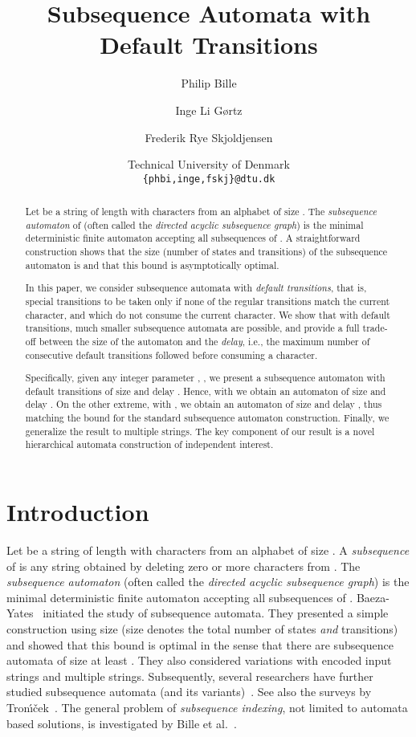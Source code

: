 \documentclass[a4paper,11pt]{article}
\title{Subsequence Automata with Default Transitions}
\author{Philip Bille \and Inge Li G\o rtz \and Frederik Rye Skjoldjensen}
\date{\small Technical University of Denmark\\ 
  \footnotesize\texttt{\{phbi,inge,fskj\}@dtu.dk}}
\begin{document}
\maketitle
\begin{abstract}
Let  be a string of length  with characters from an alphabet of size . The  \emph{subsequence automaton} of  (often called the \emph{directed acyclic subsequence graph}) is the minimal deterministic finite automaton accepting all subsequences of . A straightforward construction shows that the size (number of states and transitions) of the subsequence automaton is   and that this bound is asymptotically optimal. 

In this paper, we consider subsequence automata with \emph{default transitions}, that is, special transitions to be taken only if none of the regular transitions match the current character, and which do not consume the current character. We show that with default transitions, much smaller subsequence automata are possible, and provide a full trade-off between the size of the automaton and the \emph{delay}, i.e., the maximum number of consecutive default transitions followed before consuming a character. 

Specifically, given any integer parameter , , we present a subsequence automaton with default transitions of size  and delay . Hence, with  we obtain an automaton of size  and delay . On the other extreme, with , we obtain an automaton of size  and delay , thus matching the bound for the standard subsequence automaton construction. Finally, we generalize the result to multiple strings. The key component of our result is a novel hierarchical automata construction of independent interest. 
\end{abstract}



\section{Introduction}

Let  be a string of length  with characters from an alphabet of size . A \emph{subsequence} of  is any string obtained by deleting zero or more characters from . The \emph{subsequence automaton} (often called the \emph{directed acyclic subsequence graph}) is the minimal deterministic finite automaton accepting all subsequences of . Baeza-Yates~\cite{BaezaYates1991} initiated the study of subsequence automata. They presented a simple construction using  size (size denotes the total number of states \emph{and} transitions) and showed that this bound is optimal in the sense that there are subsequence automata of size at least . They also considered variations with encoded input strings and multiple strings. Subsequently, several researchers have further studied subsequence automata (and its variants)~\cite{tronivcek2005size,CMT2003,crochemore1999directed,Tronivcek2001episode,hoshino2000online,farhana2010finite,bannai2003inferring,tronivcek1999operations}. See also the surveys by Tron\'{\i}\v{c}ek~\cite{Tronicek2001,tronicek2003common}. The general problem of \emph{subsequence indexing}, not limited to automata based solutions, is investigated by Bille et al.~\cite{BFC2008}.
\end{document}
